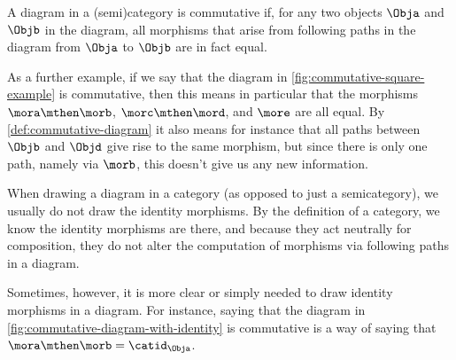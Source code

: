 \begin{marginfigure}
	\centering
	\caption{}
	\label{fig:commutative-diagram-example-prep}
\end{marginfigure}

\begin{marginfigure}
	\centering
	\caption{}
	\label{fig:commutative-diagram-example}
\end{marginfigure}

\begin{marginfigure}
	\centering
	\caption{}
	\label{fig:commutative-square-example}
\end{marginfigure}

\begin{marginfigure}
	\centering
	\caption{}
	\label{fig:commutative-diagram-with-identity}
\end{marginfigure}

\begin{definition}
	\label{def:commutative-diagram}
	A diagram in a (semi)category is commutative if, for any two objects $\Obja$ and $\Objb$ in the diagram, all morphisms that arise from following paths in the diagram from $\Obja$ to $\Objb$ are in fact equal.
\end{definition}

As a further example, if we say that the diagram in \cref{fig:commutative-square-example} is commutative, then this means in particular that the morphisms $\mora \mthen \morb$, $\morc \mthen \mord$, and $\more$ are all equal.
By \cref{def:commutative-diagram} it also means for instance that all paths between $\Objb$ and $\Objd$ give rise to the same morphism, but since there is only one path, namely via $\morb$, this doesn't give us any new information.

\begin{remark}
	When drawing a diagram in a category (as opposed to just a semicategory), we usually do not draw the identity morphisms.
	By the definition of a category, we know the identity morphisms are there, and because they act neutrally for composition, they do not alter the computation of morphisms via following paths in a diagram.

	Sometimes, however, it is more clear or simply needed to draw identity morphisms in a diagram.
	For instance, saying that the diagram in \cref{fig:commutative-diagram-with-identity} is commutative is a way of saying that $\mora \mthen \morb = \catid_{\Obja}$.
\end{remark}

